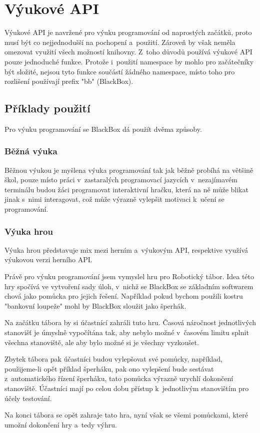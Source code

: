 \chapter{Výukové API}

Výukové API je navržené pro výuku programování od naprostých začátků, proto musí být co nejjednodušší na pochopení a~použití.
Zároveň by však neměla omezovat využití všech možností knihovny.
Z~toho důvodů používá výukové API pouze jednoduché funkce.
Protože i~použití namespace by mohlo pro začátečníky být složité, nejsou tyto funkce součástí žádného namespace, místo toho pro rozlišení používají prefix "bb" (BlackBox).



\section{Příklady použití}

Pro výuku programování se BlackBox dá použít dvěma způsoby.

\subsection{Běžná výuka}

Běžnou výukou je myšlena výuka programování tak jak běžně probíhá na většině škol, pouze místo práci v~zastaralých programovací jazycích v~nezajímavém terminálu budou žáci programovat interaktivní hračku, která na ně může blikat jinak s~nimi interagovat, což může výrazně vylepšit motivaci k~učení se programování.

\subsection{Výuka hrou}

Výuka hrou představuje mix mezi herním a~výukovým API, respektive využívá výukovou verzi herního API.

Právě pro výuku programování jsem vymyslel hru pro Robotický tábor.
Idea této hry spočívá ve vytvoření sady úloh, v~nichž se BlackBox se základním softwarem chová jako pomůcka pro jejich řešení.
Například pokud bychom použili kostru "bankovní loupeže" mohl by BlackBox sloužit jako šperhák. %

Na začátku tábora by si účastnící zahráli tuto hru.
Časová náročnost jednotlivých stanovišť je úmyslně vypočítána tak, aby nebylo možné v~časovém limitu splnit všechna stanoviště, ale aby bylo možné si je všechny vyzkoušet.

Zbytek tábora pak účastníci budou vylepšovat své pomůcky, například, použijeme-li opět příklad šperháku, pak ono vylepšení bude sestávat z~automatického řízení šperháku, tato pomůcka výrazně urychlí dokončení stanoviště.
Účastníci mají po celou dobu přístup k~jednotlivým stanovištím pro účely testování.

Na konci tábora se opět zahraje tato hra, nyní však se všemi pomůckami, které umožní dokončení hry a~tedy výhru.
